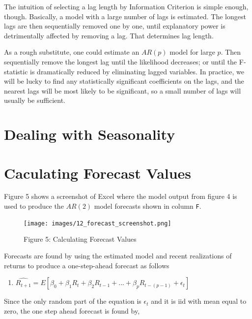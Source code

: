 \documentclass[
]{book}
\providecommand{\tightlist}{%
  \setlength{\itemsep}{0pt}\setlength{\parskip}{0pt}}
\begin{document}
The intuition of selecting a lag length by Information Criterion is simple enough, though. Basically, a model with a large number of lags is estimated. The longest lags are then sequentially removed one by one, until explanatory power is detrimentally affected by removing a lag. That determines lag length.

As a rough substitute, one could estimate an \(AR(p)\) model for large \(p\). Then sequentially remove the longest lag until the likelihood decreases; or until the F-statistic is dramatically reduced by eliminating lagged variables. In practice, we will be lucky to find any statistically significant coefficients on the lags, and the nearest lags will be most likely to be significant, so a small number of lags will usually be sufficient.

\hypertarget{dealing-with-seasonality}{%
\section{Dealing with Seasonality}\label{dealing-with-seasonality}}

\hypertarget{caculating-forecast-values}{%
\section{Caculating Forecast Values}\label{caculating-forecast-values}}

Figure 5 shows a screenshot of Excel where the model output from figure 4 is used to produce the \(AR(2)\) model forecasts shown in column \texttt{F}.

\begin{figure}
\centering
\texttt{[image: images/12\_forecast\_screenshot.png]}
\caption{Figure 5: Calculating Forecast Values}
\end{figure}

Forecasts are found by using the estimated model and recent realizations of returns to produce a one-step-ahead forecast as follows

\begin{enumerate}
\def\labelenumi{\arabic{enumi}.}
\setcounter{enumi}{2}
\tightlist
\item
  \(\hat{R_{t+1}} = E[\beta_0 + \beta_1R_{t} + \beta_2R_{t-1}+ ... + \beta_{p}R_{t-(p-1)} + \epsilon_t]\)
\end{enumerate}

Since the only random part of the equation is \(\epsilon_t\) and it is iid with mean equal to zero, the one step ahead forecast is found by,
\end{document}
